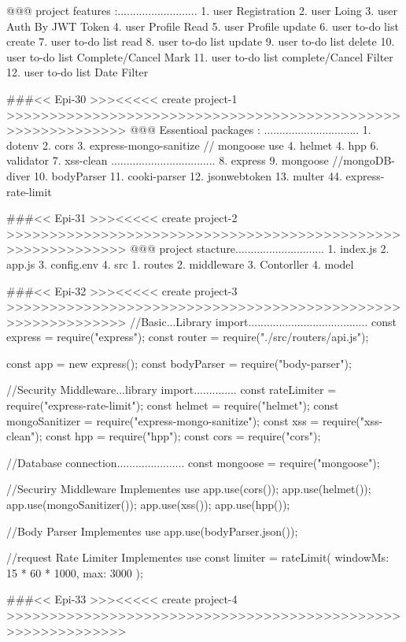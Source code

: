 @@@ project features :..........................
1. user Registration
2. user Loing 
3. user Auth By JWT Token
4. user Profile Read
5. user Profile update
6. user to-do list create
7. user to-do list read
8. user to-do list update
9. user to-do list delete 
10. user to-do list Complete/Cancel Mark 
11. user to-do list complete/Cancel Filter
12. user to-do list Date Filter

###<< Epi-30 >>><<<<< create project-1 >>>>>>>>>>>>>>>>>>>>>>>>>>>>>>>>>>>>>>>>>>>>>>>>>>>>>>>>>>>>
@@@ Essentioal packages : ...............................
1. dotenv
2. cors
3. express-mongo-sanitize // mongoose use
4. helmet
4. hpp
6. validator
7. xss-clean
..................................
8. express
9. mongoose //mongoDB-diver 
10. bodyParser
11. cooki-parser
12. jsonwebtoken
13. multer
44. express-rate-limit

###<< Epi-31 >>><<<<< create project-2 >>>>>>>>>>>>>>>>>>>>>>>>>>>>>>>>>>>>>>>>>>>>>>>>>>>>>>>>>>>>
@@@ project stacture.............................
1. index.js
2. app.js
3. config.env 
4. src 
1. routes
2. middleware
3. Contorller
4. model

###<< Epi-32 >>><<<<< create project-3 >>>>>>>>>>>>>>>>>>>>>>>>>>>>>>>>>>>>>>>>>>>>>>>>>>>>>>>>>>>>
//Basic...Library import.......................................
const express = require("express");
const router = require("./src/routers/api.js");

const app = new express();
const bodyParser = require("body-parser");

//Security Middleware...library import..............
const rateLimiter = require("express-rate-limit");
const helmet = require("helmet");
const mongoSanitizer = require("express-mongo-sanitize");
const xss = require("xss-clean");
const hpp = require("hpp");
const cors = require("cors");

//Database connection......................
const mongoose = require("mongoose");

//Securiry Middleware Implementes use
app.use(cors());
app.use(helmet());
app.use(mongoSanitizer());
app.use(xss());
app.use(hpp());

//Body Parser Implementes use
app.use(bodyParser.json());

//request Rate Limiter Implementes use
const limiter = rateLimit({ windowMs: 15 * 60 * 1000, max: 3000 });

###<< Epi-33 >>><<<<< create project-4 >>>>>>>>>>>>>>>>>>>>>>>>>>>>>>>>>>>>>>>>>>>>>>>>>>>>>>>>>>>>